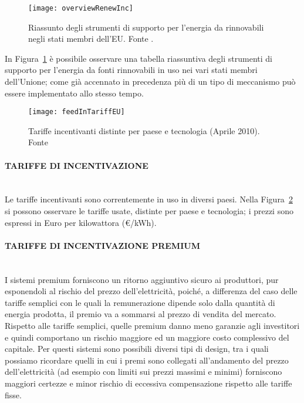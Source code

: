 \documentclass[12pt,a4paper,openright,twoside]{report}
\newcommand{\myparagraph}[1]{\paragraph{#1}\mbox{}\\}
\begin{document}
\begin{figure}[H]
	\centering
	\texttt{[image: overviewRenewInc]}
	\caption{Riassunto degli strumenti di supporto per l'energia da rinnovabili negli stati membri dell'EU. Fonte \cite{energyEU}.}
	\label{overviewRenewInc}
\end{figure}

In Figura~\ref{overviewRenewInc} è possibile osservare una tabella riassuntiva degli strumenti di supporto per l'energia da fonti rinnovabili in uso nei vari stati membri dell'Unione; come già accennato in precedenza più di un tipo di meccanismo può essere implementato allo stesso tempo.

\begin{figure}[H]
	\centering
	\texttt{[image: feedInTariffEU]}
	\caption{Tariffe incentivanti distinte per paese e tecnologia (Aprile 2010). Fonte \cite{financingRenewEnergy}}
	\label{feedInTariffEU}
\end{figure}

\myparagraph{TARIFFE DI INCENTIVAZIONE}
Le tariffe incentivanti sono correntemente in uso in diversi paesi. Nella Figura~\ref{feedInTariffEU} si possono osservare le tariffe usate, distinte per paese e tecnologia; i prezzi sono espressi in Euro per kilowattora (\euro/kWh).

\myparagraph{TARIFFE DI INCENTIVAZIONE PREMIUM}
I sistemi premium forniscono un ritorno aggiuntivo sicuro ai produttori, pur esponendoli al rischio del prezzo dell'elettricità, poiché, a differenza del caso delle tariffe semplici con le quali la remunerazione dipende solo dalla quantità di energia prodotta, il premio va a sommarsi al prezzo di vendita del mercato.
Rispetto alle tariffe semplici, quelle premium danno meno garanzie agli investitori e quindi comportano un rischio maggiore ed un maggiore costo complessivo del capitale. Per questi sistemi sono possibili diversi tipi di design, tra i quali possiamo ricordare quelli in cui i premi sono collegati all'andamento del prezzo dell'elettricità (ad esempio con limiti sui prezzi massimi e minimi) forniscono maggiori certezze e minor rischio di eccessiva compensazione rispetto alle tariffe fisse.  
\end{document}

